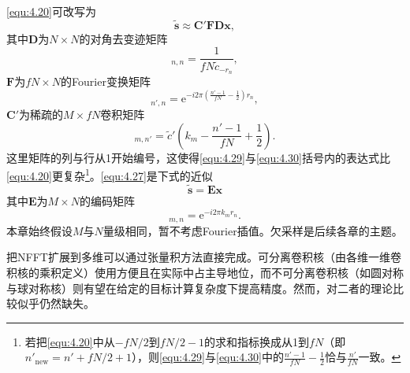 \documentclass[12pt]{article}
\let\originallautoref\autoref
\renewcommand{\autoref}[1]{\allowbreak\originallautoref{#1}}
\begin{document}
\autoref{equ:4.20}可改写为
\begin{equation}
    \tilde{\bm{s}}\approx\mathbf{C}'\mathbf{F}\mathbf{D}\bm{x},
    \label{equ:4.27}
\end{equation}
其中$\mathbf{D}$为$N\times N$的对角去变迹矩阵
\begin{equation}
    [\mathbf{D}]_{n,n}=\frac{1}{fN\tilde{c}_{-r_n}},
    \label{equ:4.28}
\end{equation}
$\mathbf{F}$为$fN\times N$的Fourier变换矩阵
\begin{equation}
    [\mathbf{F}]_{n',n}=\mathrm{e}^{-i2\pi\left(\frac{n'-1}{fN}-\frac{1}{2}\right)r_n},
    \label{equ:4.29}
\end{equation}
$\mathbf{C}'$为稀疏的$M\times fN$卷积矩阵
\begin{equation}
    [\mathbf{C}']_{m,n'}=\tilde{c}'\left(k_m-\frac{n'-1}{fN}+\frac{1}{2}\right).
    \label{equ:4.30}
\end{equation}
这里矩阵的列与行从1开始编号，这使得\autoref{equ:4.29}与\autoref{equ:4.30}括号内的表达式比\autoref{equ:4.20}更复杂\footnote{若把\autoref{equ:4.20}中从$-fN/2$到$fN/2-1$的求和指标换成从1到$fN$（即$n'_{\text{new}}=n'+fN/2+1$），则\autoref{equ:4.29}与\autoref{equ:4.30}中的$\frac{n'-1}{fN}-\frac{1}{2}$恰与$\frac{n'}{fN}$一致。}。\autoref{equ:4.27}是下式的近似
\begin{equation}
    \tilde{\bm{s}}=\mathbf{E}\bm{x}
    \label{equ:4.31}
\end{equation}
其中$\mathbf{E}$为$M\times N$的编码矩阵
\begin{equation}
    [\mathbf{E}]_{m,n}=\mathrm{e}^{-i2\pi k_mr_n}.
    \label{equ:4.32}
\end{equation}
本章始终假设$M$与$N$量级相同，暂不考虑Fourier插值。欠采样是后续各章的主题。

把NFFT扩展到多维可以通过张量积方法直接完成。可分离卷积核（由各维一维卷积核的乘积定义）使用方便且在实际中占主导地位，而不可分离卷积核（如圆对称与球对称核）则有望在给定的目标计算复杂度下提高精度。然而，对二者的理论比较似乎仍然缺失。
\end{document}
